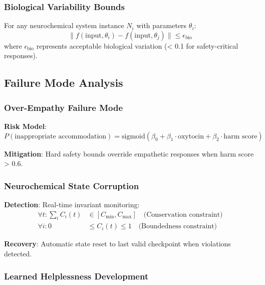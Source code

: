 \documentclass[12pt]{article}
\begin{document}
\subsubsection{Biological Variability Bounds}

For any neurochemical system instance $N_i$ with parameters $\theta_i$:
\begin{equation}
\|f(\text{input}, \theta_i) - f(\text{input}, \theta_j)\| \leq \epsilon_{\text{bio}}
\end{equation}
where $\epsilon_{\text{bio}}$ represents acceptable biological variation (< 0.1 for safety-critical responses).

\subsection{Failure Mode Analysis}

\subsubsection{Over-Empathy Failure Mode}

\textbf{Risk Model}:
\begin{equation}
P(\text{inappropriate accommodation}) = \text{sigmoid}(\beta_0 + \beta_1 \cdot \text{oxytocin} + \beta_2 \cdot \text{harm score})
\end{equation}

\textbf{Mitigation}: Hard safety bounds override empathetic responses when harm score > 0.6.

\subsubsection{Neurochemical State Corruption}

\textbf{Detection}: Real-time invariant monitoring:
\begin{align}
\forall t: \sum_i C_i(t) &\in [C_{\min}, C_{\max}] \quad \text{(Conservation constraint)} \\
\forall i: 0 &\leq C_i(t) \leq 1 \quad \text{(Boundedness constraint)}
\end{align}

\textbf{Recovery}: Automatic state reset to last valid checkpoint when violations detected.

\subsubsection{Learned Helplessness Development}
\end{document}
